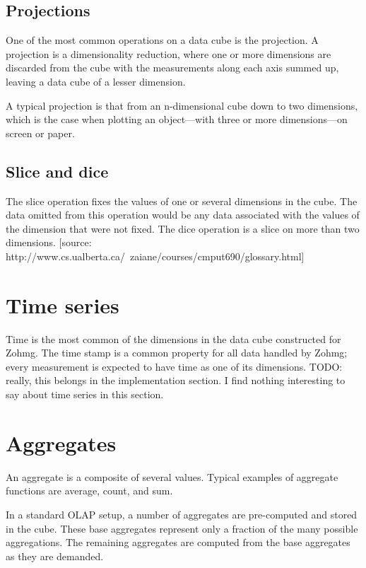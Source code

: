 \documentclass[a4paper,10pt]{book}
\begin{document}
\subsection{Projections}

One of the most common operations on a data cube is the projection. A
projection is a dimensionality reduction, where one or more dimensions are
discarded from the cube with the measurements along each axis summed up,
leaving a data cube of a lesser dimension.

A typical projection is that from an n-dimensional cube down to two
dimensions, which is the case when plotting an object---with three or more
dimensions---on screen or paper.


\subsection{Slice and dice}

The slice operation fixes the values of one or several dimensions in the cube. The data omitted from this operation would be any data associated with the values of the dimension that were not fixed. The dice operation is a slice on more than two dimensions. [source: http://www.cs.ualberta.ca/~zaiane/courses/cmput690/glossary.html]



\section{Time series}

Time is the most common of the dimensions in the data cube constructed for Zohmg. The time stamp is a common property for all data handled by Zohmg; every measurement is expected to have time as one of its dimensions. TODO: really, this belongs in the implementation section. I find nothing interesting to say about time series in this section.



\section{Aggregates}

An aggregate is a composite of several values. Typical examples of
aggregate functions are average, count, and sum.

In a standard OLAP setup, a number of aggregates are pre-computed and
stored in the cube. These base aggregates represent only a fraction of the
many possible aggregations. The remaining aggregates are computed from the
base aggregates as they are demanded.
\end{document}
